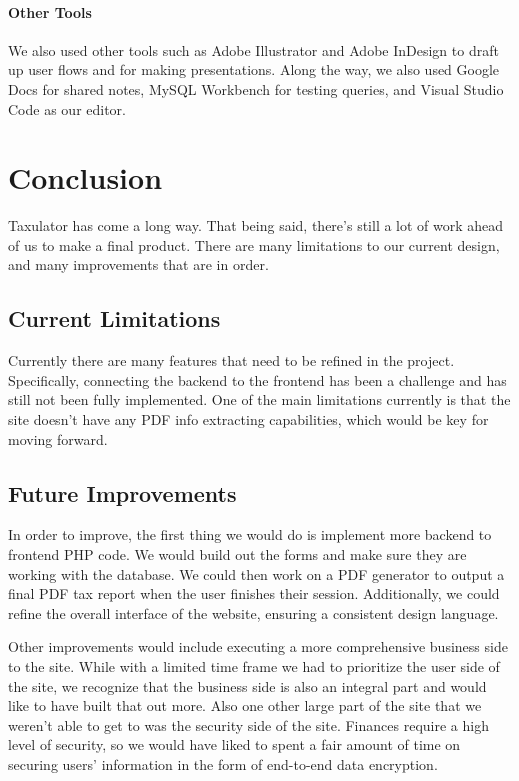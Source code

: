 \documentclass[sigconf]{acmart}
\begin{document}
\paragraph{Other Tools}
We also used other tools such as Adobe Illustrator \cite{Illustrator} and Adobe InDesign \cite{InDesign} to draft up user flows and for making presentations. Along the way, we also used Google Docs \cite{GDocs} for shared notes, MySQL Workbench \cite{Workbench} for testing queries, and Visual Studio Code \cite{VSCode} as our editor.

\section{Conclusion}
Taxulator has come a long way. That being said, there’s still a lot of work ahead of us to make a final product. There are many limitations to our current design, and many improvements that are in order.

\subsection{Current Limitations}
Currently there are many features that need to be refined in the project. Specifically, connecting the backend to the frontend has been a challenge and has still not been fully implemented. One of the main limitations currently is that the site doesn't have any PDF info extracting capabilities, which would be key for moving forward.

\subsection{Future Improvements}
In order to improve, the first thing we would do is implement more backend to frontend PHP code. We would build out the forms and make sure they are working with the database. We could then work on a PDF generator to output a final PDF tax report when the user finishes their session. Additionally, we could refine the overall interface of the website, ensuring a consistent design language.

Other improvements would include executing a more comprehensive business side to the site. While with a limited time frame we had to prioritize the user side of the site, we recognize that the business side is also an integral part and would like to have built that out more. Also one other large part of the site that we weren't able to get to was the security side of the site. Finances require a high level of security, so we would have liked to spent a fair amount of time on securing users' information in the form of end-to-end data encryption.
\end{document}
